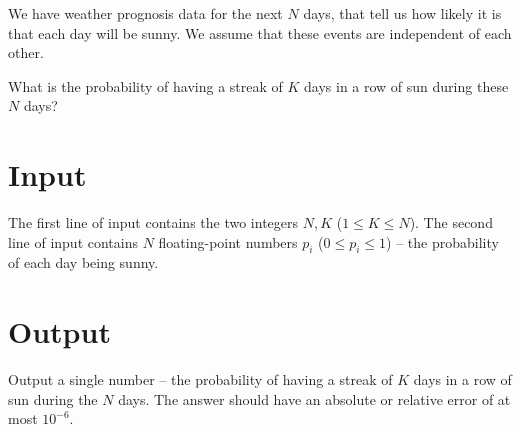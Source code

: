 
We have weather prognosis data for the next $N$ days, that
tell us how likely it is that each day will be sunny.
We assume that these events are independent of each other.

What is the probability of having a streak of $K$ days in a row
of sun during these $N$ days?

\section*{Input}
The first line of input contains the two integers $N, K$ ($1 \le K \le N$).
The second line of input contains $N$ floating-point numbers $p_i$ ($0 \le p_i \le 1$) --
the probability of each day being sunny.

\section*{Output}
Output a single number -- the probability of having a streak of $K$ days in a row
of sun during the $N$ days.
The answer should have an absolute or relative error of at most $10^{-6}$.
